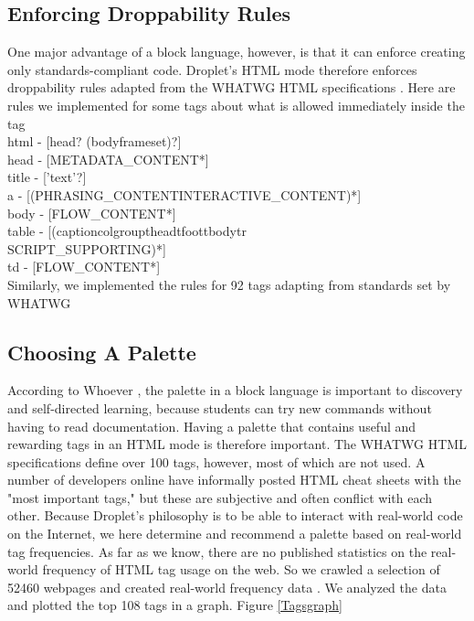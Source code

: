 \documentclass[conference]{IEEEtran}
\begin{document}
\subsection{Enforcing Droppability Rules}
One major advantage of a block language, however, is that it can enforce creating only standards-compliant code. Droplet's HTML mode therefore enforces droppability rules adapted from the WHATWG HTML specifications \cite{WHATWG}. Here are rules we implemented for some tags about what is allowed immediately inside the tag\\
html - [head? (body\textbar frameset)?]\\
head - [METADATA\_CONTENT*] \cite{metadata}\\
title - ['text'?]\\
a - [(PHRASING\_CONTENT\textbar INTERACTIVE\_CONTENT)*] \cite{phrasing} \cite{interactive}\\
body - [FLOW\_CONTENT*] \cite{flowcontent}\\
table - [(caption\textbar colgroup\textbar thead\textbar tfoot\textbar tbody\textbar tr\textbar \\ SCRIPT\_SUPPORTING)*] \cite{script}\\
td - [FLOW\_CONTENT*] \cite{flowcontent}\\
Similarly, we implemented the rules for 92 tags adapting from standards set by WHATWG \cite{WHATWG}

\subsection{Choosing A Palette}

According to Whoever \cite{Whoever}, the palette in a block language is important to discovery and self-directed learning, because students can try new commands without having to read documentation. Having a palette that contains useful and rewarding tags in an HTML mode is therefore important. The WHATWG HTML specifications define over 100 tags, however, most of which are not used. A number of developers online have informally posted HTML cheat sheets with the "most important tags," \cite{Webmonkey} \cite{SimpleGuide} \cite{Usabilla} but these are subjective and often conflict with each other. Because Droplet's philosophy is to be able to interact with real-world code on the Internet, we here determine and recommend a palette based on real-world tag frequencies. As far as we know, there are no published statistics on the real-world frequency of HTML tag usage on the web.  So we crawled a selection of 52460 webpages and created real-world frequency data \cite{FullResults}. We analyzed the data and plotted the top 108 tags in a graph. Figure \ref{Tagsgraph}
\end{document}
